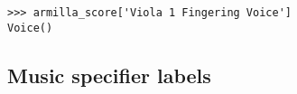 \begin{comment}
<abjad>
armilla_score['Viola 1 Fingering Voice']
</abjad>
\end{comment}

\begin{singlespacing}
\vspace{-0.5\baselineskip}
\begin{lstlisting}
>>> armilla_score['Viola 1 Fingering Voice']
Voice()
\end{lstlisting}
\end{singlespacing}

\subsection{Music specifier labels}

\begin{comment}
<abjad>
unlabeled_music_specifier = consort.MusicSpecifier()
labeled_music_specifier = consort.MusicSpecifier(labels=['labeled'])
timespan_inventory = timespantools.TimespanInventory([
    consort.PerformedTimespan(
        layer=1,
        start_offset=0,
        stop_offset=4,
        music_specifier=labeled_music_specifier,
        voice_name='Voice 1',
        ),
    consort.PerformedTimespan(
        layer=1,
        start_offset=2,
        stop_offset=7,
        music_specifier=labeled_music_specifier,
        voice_name='Voice 2',
        ),
    consort.PerformedTimespan(
        layer=2,
        start_offset=6,
        stop_offset=8,
        music_specifier=unlabeled_music_specifier,
        voice_name='Voice 1',
        ),
    consort.PerformedTimespan(
        layer=2,
        start_offset=10,
        stop_offset=(25, 2),
        music_specifier=unlabeled_music_specifier,
        voice_name='Voice 2',
        ),
    consort.PerformedTimespan(
        layer=1,
        start_offset=11,
        stop_offset=14,
        music_specifier=labeled_music_specifier,
        voice_name='Voice 1',
        ),
    consort.PerformedTimespan(
        layer=1,
        start_offset=14,
        stop_offset=16,
        music_specifier=labeled_music_specifier,
        voice_name='Voice 1',
        ),
    consort.PerformedTimespan(
        layer=1,
        start_offset=15,
        stop_offset=16,
        music_specifier=labeled_music_specifier,
        voice_name='Voice 2',
        ),
    ])
show(timespan_inventory, key='voice_name')
</abjad>
\end{comment}


